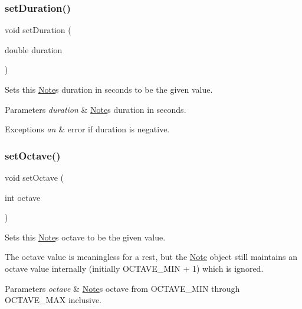 \subsubsection{\texorpdfstring{set\+Duration()}{setDuration()}}
{\footnotesize\ttfamily void set\+Duration (\begin{DoxyParamCaption}\item[{double}]{duration }\end{DoxyParamCaption})}



Sets this \mbox{\hyperlink{classNote}{Note}}\textquotesingle{}s duration in seconds to be the given value. 


\begin{DoxyParams}{Parameters}
{\em duration} & \mbox{\hyperlink{classNote}{Note}}\textquotesingle{}s duration in seconds. \\
\hline
\end{DoxyParams}

\begin{DoxyExceptions}{Exceptions}
{\em an} & error if duration is negative. \\
\hline
\end{DoxyExceptions}
\mbox{\label{classNote_ac4034a6b7e43254466284d573d9e4186}} 
\subsubsection{\texorpdfstring{set\+Octave()}{setOctave()}}
{\footnotesize\ttfamily void set\+Octave (\begin{DoxyParamCaption}\item[{int}]{octave }\end{DoxyParamCaption})}



Sets this \mbox{\hyperlink{classNote}{Note}}\textquotesingle{}s octave to be the given value. 

The octave value is meaningless for a rest, but the \mbox{\hyperlink{classNote}{Note}} object still maintains an octave value internally (initially O\+C\+T\+A\+V\+E\+\_\+\+M\+IN + 1) which is ignored. 
\begin{DoxyParams}{Parameters}
{\em octave} & \mbox{\hyperlink{classNote}{Note}}\textquotesingle{}s octave from O\+C\+T\+A\+V\+E\+\_\+\+M\+IN through O\+C\+T\+A\+V\+E\+\_\+\+M\+AX inclusive. \\
\hline
\end{DoxyParams}

